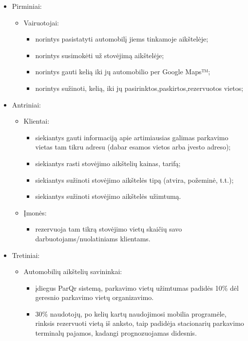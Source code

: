 \documentclass{VUMIFPSkursinis}
\begin{document}
\begin{itemize}[label={}]
	\item Pirminiai:
		\begin{itemize}[label={$\bullet$}]
			\item Vairuotojai:
				\begin{itemize}[label={--}]
					\item norintys pasistatyti automobilį jiems tinkamoje aikštelėje;
					\item norintys susimokėti už stovėjimą aikštelėje;
					\item norintys gauti kelią iki jų automobilio per Google Maps™;
					\item norintys sužinoti, kelią, iki jų pasirinktos,paskirtos,rezervuotos vietos;
				\end{itemize}
		\end{itemize}
	\item Antriniai:
		\begin{itemize}[label={$\bullet$}]
			\item Klientai:
				\begin{itemize}[label={--}]
					\item siekiantys gauti informaciją apie artimiausias galimas parkavimo vietas tam tikru adresu (dabar esamos vietos arba įvesto adreso);
					\item siekiantys rasti stovėjimo aikštelių kainas, tarifą;
					\item siekiantys sužinoti stovėjimo aikštelės tipą (atvira, požeminė, t.t.);
					\item siekiantys sužinoti stovėjimo aikštelės užimtumą.
				\end{itemize}					
			\item Įmonės:
				\begin{itemize}[label={--}]
					\item rezervuoja tam tikrą stovėjimo vietų skaičių savo darbuotojams/nuolatiniams klientams.
				\end{itemize}
		\end{itemize}
	\item Tretiniai:
		\begin{itemize}[label={$\bullet$}]
			\item Automobilių aikštelių savininkai:
				\begin{itemize}[label={--}]
					\item įdiegus ParQr sistemą, parkavimo vietų užimtumas padidės 10\% dėl geresnio parkavimo vietų organizavimo.
					\item 30\% naudotojų, po kelių kartų naudojimosi mobilia programėle, rinksis rezervuoti vietą iš anksto, taip padidėja stacionarių parkavimo terminalų pajamos, kadangi prognozuojamas didesnis.

\end{itemize}
\end{itemize}
\end{itemize}
\end{document}
